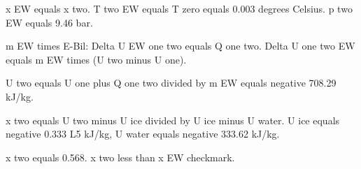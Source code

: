 x EW equals x two.  
T two EW equals T zero equals 0.003 degrees Celsius.  
p two EW equals 9.46 bar.  

m EW times E-Bil: Delta U EW one two equals Q one two.  
Delta U one two EW equals m EW times (U two minus U one).  

U two equals U one plus Q one two divided by m EW equals negative 708.29 kJ/kg.  

x two equals U two minus U ice divided by U ice minus U water.  
U ice equals negative 0.333 L5 kJ/kg, U water equals negative 333.62 kJ/kg.  

x two equals 0.568.  
x two less than x EW checkmark.